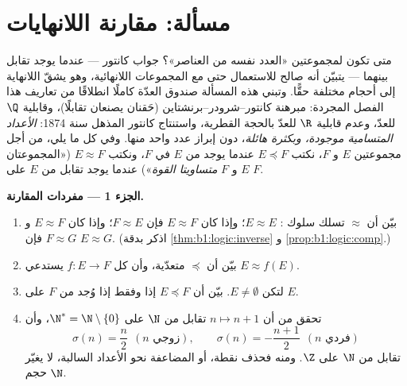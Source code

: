 \section{مسألة: مقارنة اللانهايات}

\begin{problem}\label{pb:b1:logic:1}
متى تكون لمجموعتين «العدد نفسه من العناصر»؟ جواب كانتور --- عندما
يوجد تقابل بينهما --- يتبيّن أنه صالح للاستعمال حتى مع المجموعات
اللانهائية، وهو يشقّ اللانهاية إلى أحجام مختلفة حقًّا. وتبني هذه
المسألة صندوق العدّة كاملًا انطلاقًا من تعاريف هذا الفصل المجردة:
مبرهنة كانتور--شرودر--برنشتاين (حَقنان يصنعان تقابلًا)، وقابلية
$\Q$ للعدّ، وعدم قابلية $\R$ للعدّ بالحجة القطرية، واستنتاج كانتور
المذهل سنة 1874: \emph{الأعداد المتسامية موجودة، وبكثرة هائلة}،
دون إبراز عدد واحد منها.
وفي كل ما يلي، من أجل مجموعتين $E$ و $F$، نكتب $E \preceq F$ عندما
يوجد  من $E$ في $F$، ونكتب $E \approx F$ («المجموعتان
$E$ و $F$ \emph{متساويتا القوة}») عندما يوجد تقابل من $E$ على $F$.

\medskip
\noindent\textbf{الجزء 1 --- مفردات المقارنة.}
\begin{enumerate}
  \item بيّن أن $\approx$ تسلك سلوك :
        $E \approx E$؛ وإذا كان $E \approx F$ فإن $F \approx E$؛
        وإذا كان $E \approx F$ و $F \approx G$ فإن $E \approx G$.
        (اذكر بدقة \cref{thm:b1:logic:inverse} و
        \cref{prop:b1:logic:comp}.)
  \item بيّن أن $\preceq$ متعدّية، وأن كل 
        $f \colon E \to F$ يستدعي $E \approx f(E)$.
  \item لتكن $E \neq \emptyset$. بيّن أن $E \preceq F$ إذا وفقط
        إذا وُجد  من $F$ على $E$.
  \item تحقق من أن $n \mapsto n + 1$ تقابل من $\N$ على
        $\N^* = \N \setminus \{0\}$، وأن
        \[
        \sigma(n) = \frac n2 \ \ (n \text{ زوجي}), \qquad
        \sigma(n) = -\frac{n+1}2 \ \ (n \text{ فردي})
        \]
        تقابل من $\N$ على $\Z$. ومنه فحذف نقطة، أو المضاعفة نحو
        الأعداد السالبة، لا يغيّر حجم $\N$.
\end{enumerate}


\end{problem}
